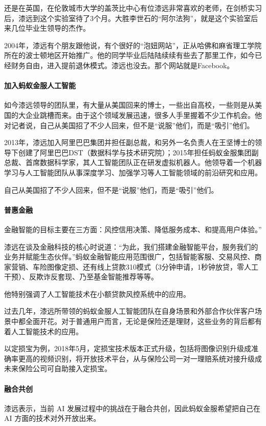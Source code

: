 \documentclass[letterpaper,10pt,english]{sphinxmanual}
\begin{document}
还是在英国，在伦敦城市大学的盖茨比中心有位漆远非常喜欢的老师，在剑桥实习后，漆远到这个实验室待了3个月。大胜李世石的“阿尔法狗”，就是这个实验室后来几位毕业生领导的杰作。

2004年，漆远有个朋友跟他说，有个很好的“泡妞网站”，正从哈佛和麻省理工学院所在的波士顿地区开始推广。他的同学毕业后陆陆续续有些去了那里工作，如今已经财务自由，进入提前退休模式。漆远也没去。那个网站就是Facebook。


\paragraph{加入蚂蚁金服人工智能}
\label{\detokenize{chapter_AI_expert/qi_yuan:id3}}
如今漆远领导的团队里，有大量从美国回来的博士，一些出自高校，一些则是从美国的大企业跳槽而来。由于这个领域发展迅速，很多人手里握着不少工作机会。他对记者说，自己从美国招了不少人回来，但不是“说服”他们，而是“吸引”他们。

2013年，漆远加入阿里巴巴集团并担任副总裁，和另外一名负责人在王坚博士的领导下创建了阿里巴巴DST（数据科学与技术研究院）；2015年担任蚂蚁金服集团副总裁、首席数据科学家，其人工智能团队正在研发虚拟机器人。他领导着一个机器学习与人工智能团队从事深度学习、加强学习等人工智能领域的前沿研究和应用。

自己从美国招了不少人回来，但不是“说服”他们，而是“吸引”他们。


\paragraph{普惠金融}
\label{\detokenize{chapter_AI_expert/qi_yuan:id4}}
金融智能的目标主要在三方面：风控信用决策、降低服务成本、和提高用户体验。”

漆远在谈及金融科技的核心时说道：“为此，我们搭建金融智能平台，服务我们的业务并赋能生态伙伴。”蚂蚁金融智能应用范围很广，包括智能客服、交易风控、商家营销、车险图像定损、还有线上贷款310模式（3分钟申请，1秒钟放贷，零人工干预）、反欺诈反套现、乃至基金智能推荐等等。

他特别强调了人工智能技术在小额贷款风控系统中的应用。

过去几年，漆远所带领的蚂蚁金服人工智能团队在自身场景和外部合作伙伴客户场景中都全面开花。对于普通用户而言，无论是保险还是理财，这些业务的背后都有着人工智能技术的应用。

以定损宝为例，2018年5月，定损宝技术版本正式升级，包括将图像识别升级成准确率更高的视频识别，将开放技术平台，从与保险公司一对一理赔系统对接升级成未来保险公司可自助接入定损宝。


\paragraph{融合共创}
\label{\detokenize{chapter_AI_expert/qi_yuan:id5}}
漆远表示，当前 AI 发展过程中的挑战在于融合共创，因此蚂蚁金服希望把自己在
AI 方面的技术对外开放出来。
\end{document}
